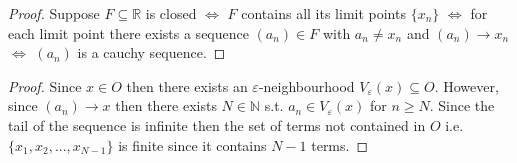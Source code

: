 \begin{proof}
    Suppose $F \subseteq \mathbb{R}$ is closed
    $\Leftrightarrow$ $F$ contains all its limit points $\{ x_n \}$
    $\Leftrightarrow$ for each limit point there exists a sequence 
    $(a_n)\in F$ with $a_n \neq x_n$ and $(a_n)\rightarrow x_n$
    $\Leftrightarrow$ $(a_n)$ is a cauchy sequence.
\end{proof}

\begin{proof}
    Since $x \in O$ then there exists an $\varepsilon$-neighbourhood
     $V_\varepsilon(x)\subseteq O$. However, since $(a_n)\rightarrow x$
     then there exists $N\in \mathbb{N}$ s.t. $a_n \in V_\varepsilon(x) $
     for $n \geq N$. Since the tail of the sequence is infinite then the 
     set of terms not contained in $O$ i.e. $\{x_1, x_2, ..., x_{N-1}\}$
     is finite since it contains $N-1$ terms.
\end{proof}

